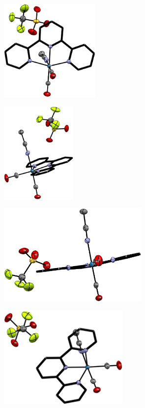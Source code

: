 \begin{figure}[!ht]
 \centering
 \begin{subfigure}[b]{0.49\textwidth}
  \includegraphics[clip=true, width=\textwidth, height=50mm, keepaspectratio]{images/xray8a.eps}
 \end{subfigure}
 \begin{subfigure}[b]{0.49\textwidth}
  \includegraphics[clip=true, width=\textwidth, height=50mm, keepaspectratio]{images/xray8b.eps}
 \end{subfigure}
 \begin{subfigure}[b]{0.49\textwidth}
  \includegraphics[clip=true, width=\textwidth, height=50mm, keepaspectratio]{images/xray8c.eps}
 \end{subfigure}
 \begin{subfigure}[b]{0.49\textwidth}
  \includegraphics[clip=true, width=\textwidth, height=50mm, keepaspectratio]{images/xray8d.eps}

\end{subfigure}
\end{figure}
